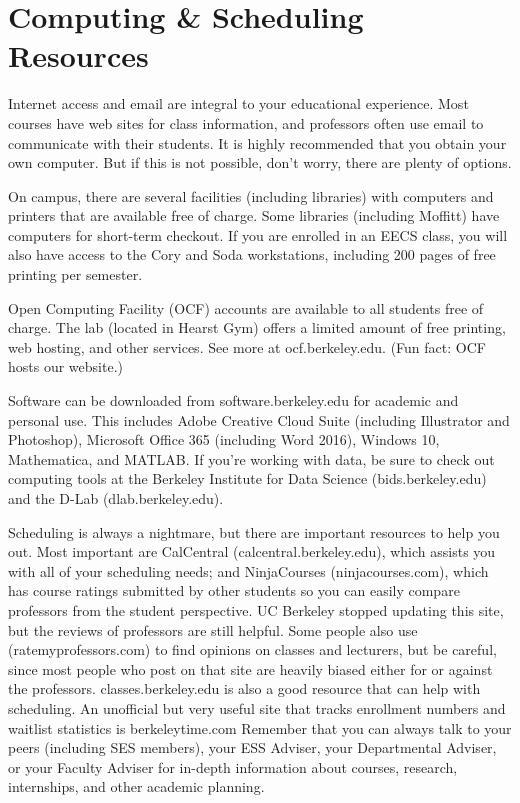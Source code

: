 \chapter*{Computing \& Scheduling Resources}

Internet access and email are integral to your educational experience. Most courses have web sites for class information, and professors often use email to communicate with their students. It is highly recommended that you obtain your own computer. But if this is not possible, don’t worry, there are plenty of options.

On campus, there are several facilities (including libraries) with computers and printers that are available free of charge. Some libraries (including Moffitt) have computers for short-term checkout. If you are enrolled in an EECS class, you will also have access to the Cory and Soda workstations, including 200 pages of free printing per semester.

Open Computing Facility (OCF) accounts are available to all students free of charge. The lab (located in Hearst Gym) offers a limited amount of free printing, web hosting, and other services. See more at {\selectfont ocf.berkeley.edu}. (Fun fact: OCF hosts our website.)

Software can be downloaded from {\selectfont software.berkeley.edu} for academic and personal use. This includes Adobe Creative Cloud Suite (including Illustrator and Photoshop), Microsoft Office 365 (including Word 2016), Windows 10, Mathematica, and MATLAB. If you’re working with data, be sure to check out computing tools at the Berkeley Institute for Data Science ({\selectfont bids.berkeley.edu}) and the D-Lab ({\selectfont dlab.berkeley.edu}).

Scheduling is always a nightmare, but there are important resources to help you out. Most important are CalCentral ({\selectfont calcentral.berkeley.edu}), which assists you with all of your scheduling needs; and NinjaCourses ({\selectfont ninjacourses.com}), which has course ratings submitted by other students so you can easily compare professors from the student perspective. UC Berkeley stopped updating this site, but the reviews of professors are still helpful.  Some people also use ({\selectfont ratemyprofessors.com}) to find opinions on classes and lecturers, but be careful, since most people who post on that site are heavily biased either for or against the professors.
{\selectfont classes.berkeley.edu} is also a good resource that can help with scheduling. An unofficial but very useful site that tracks enrollment numbers and waitlist statistics is { \selectfont berkeleytime.com}
Remember that you can always talk to your peers (including SES members), your ESS Adviser, your Departmental Adviser, or your Faculty Adviser for in-depth information about courses, research, internships, and other academic planning.


